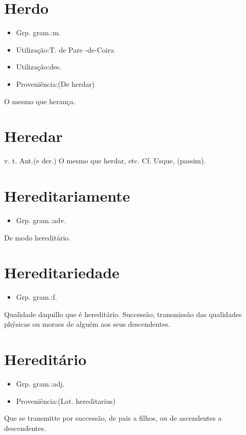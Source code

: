 \documentclass{article}
\begin{document}
\section{Herdo}
\begin{itemize}
\item {Grp. gram.:m.}
\end{itemize}
\begin{itemize}
\item {Utilização:T. de Pare -de-Coira}
\end{itemize}
\begin{itemize}
\item {Utilização:des.}
\end{itemize}
\begin{itemize}
\item {Proveniência:(De \textunderscore herdar\textunderscore )}
\end{itemize}
O mesmo que \textunderscore herança\textunderscore .
\section{Heredar}
\textunderscore v. t. Ant.\textunderscore  (e der.)
O mesmo que \textunderscore herdar\textunderscore , etc. Cf. Usque, (\textunderscore passim\textunderscore ).
\section{Hereditariamente}
\begin{itemize}
\item {Grp. gram.:adv.}
\end{itemize}
De modo hereditário.
\section{Hereditariedade}
\begin{itemize}
\item {Grp. gram.:f.}
\end{itemize}
Qualidade daquillo que é hereditário.
Successão; transmissão das qualidades phýsicas ou moraes de alguém aos seus descendentes.
\section{Hereditário}
\begin{itemize}
\item {Grp. gram.:adj.}
\end{itemize}
\begin{itemize}
\item {Proveniência:(Lat. \textunderscore hereditarius\textunderscore )}
\end{itemize}
Que se transmitte por successão, de pais a filhos, ou de ascendentes a descendentes.
\end{document}
